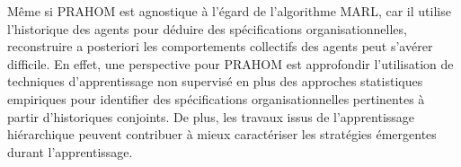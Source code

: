 Même si PRAHOM est agnostique à l'égard de l'algorithme MARL, car il utilise l'historique des agents pour déduire des spécifications organisationnelles, reconstruire a posteriori les comportements collectifs des agents peut s'avérer difficile. En effet, une perspective pour PRAHOM est approfondir l'utilisation de techniques d'apprentissage non supervisé en plus des approches statistiques empiriques pour identifier des spécifications organisationnelles pertinentes à partir d'historiques conjoints. De plus, les travaux issus de l'apprentissage hiérarchique peuvent contribuer à mieux caractériser les stratégies émergentes durant l'apprentissage.
